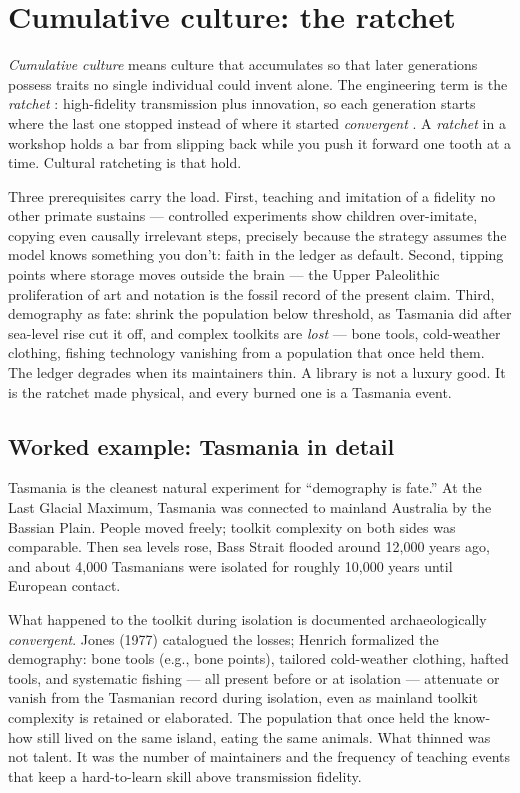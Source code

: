 \section{Cumulative culture: the ratchet}

\textit{Cumulative culture} means culture that accumulates so that later generations possess traits no single individual could invent alone. The engineering term is the \textit{ratchet} \citep{tomasello}: high-fidelity transmission plus innovation, so each generation starts where the last one stopped instead of where it started \textit{convergent} \citep{tomasello,henrich}. A \textit{ratchet} in a workshop holds a bar from slipping back while you push it forward one tooth at a time. Cultural ratcheting is that hold.

Three prerequisites carry the load. First, teaching and imitation of a fidelity no other primate sustains --- controlled experiments show children over-imitate, copying even causally irrelevant steps, precisely because the strategy assumes the model knows something you don't: faith in the ledger as default. Second, tipping points where storage moves outside the brain --- the Upper Paleolithic proliferation of art and notation is the fossil record of the present claim. Third, demography as fate: shrink the population below threshold, as Tasmania did after sea-level rise cut it off, and complex toolkits are \textit{lost} --- bone tools, cold-weather clothing, fishing technology vanishing from a population that once held them. The ledger degrades when its maintainers thin. A library is not a luxury good. It is the ratchet made physical, and every burned one is a Tasmania event.

\subsection*{Worked example: Tasmania in detail}

Tasmania is the cleanest natural experiment for ``demography is fate.'' At the Last Glacial Maximum, Tasmania was connected to mainland Australia by the Bassian Plain. People moved freely; toolkit complexity on both sides was comparable. Then sea levels rose, Bass Strait flooded around 12,000 years ago, and about 4,000 Tasmanians were isolated for roughly 10,000 years until European contact.

What happened to the toolkit during isolation is documented archaeologically \textit{convergent}. Jones (1977) catalogued the losses; Henrich formalized the demography: bone tools (e.g., bone points), tailored cold-weather clothing, hafted tools, and systematic fishing --- all present before or at isolation --- attenuate or vanish from the Tasmanian record during isolation, even as mainland toolkit complexity is retained or elaborated. The population that once held the know-how still lived on the same island, eating the same animals. What thinned was not talent. It was the number of maintainers and the frequency of teaching events that keep a hard-to-learn skill above transmission fidelity.


